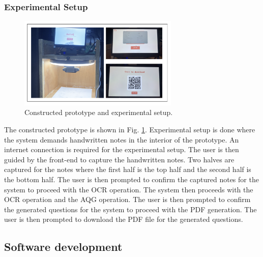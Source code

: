 \documentclass[conference]{IEEEtran}
\begin{document}
\subsubsection{Experimental Setup}
\newpage
\vspace{-1cm}
\begin{figure}[H]
\centerline{\includegraphics[width=3in]{experimental.png}}
\vspace{-0.4cm}
\caption{Constructed prototype and experimental setup.} 
\label{experimental_setup}
\end{figure}
\vspace{-0.3cm}
\indent The constructed prototype is shown in Fig. \ref{experimental_setup}.
Experimental setup is done where the system demands handwritten notes 
in the interior of the prototype. An internet connection is required for
the experimental setup. The user is then guided by the front-end 
to capture the handwritten notes. Two halves are captured for the
notes where the first half is the top half and the second half is the
bottom half. The user is then prompted to confirm the captured notes
for the system to proceed with the OCR operation. The system then
proceeds with the OCR operation and the AQG operation. The user is then
prompted to confirm the generated questions for the system to proceed
with the PDF generation. The user is then prompted to download the PDF
file for the generated questions.
\subsection{Software development}
\end{document}
